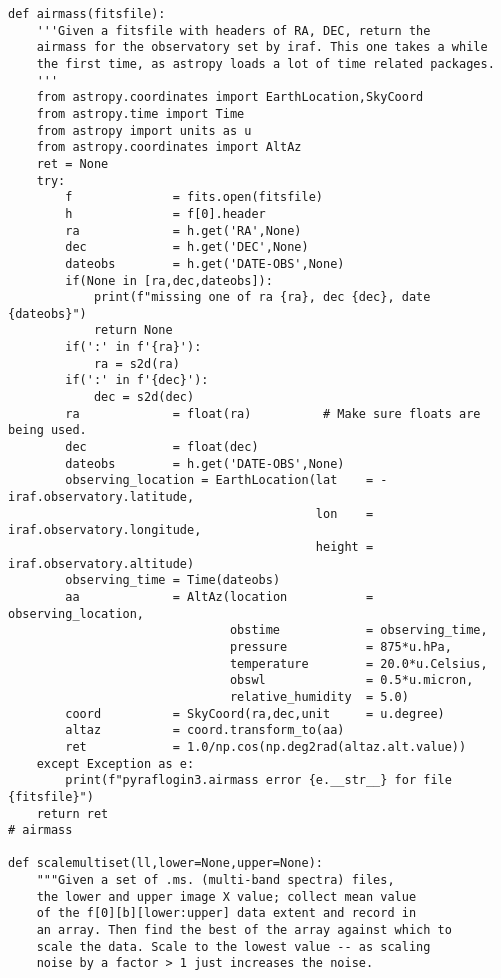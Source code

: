 {\begin{verbatim}
def airmass(fitsfile):
    '''Given a fitsfile with headers of RA, DEC, return the
    airmass for the observatory set by iraf. This one takes a while
    the first time, as astropy loads a lot of time related packages.
    '''
    from astropy.coordinates import EarthLocation,SkyCoord
    from astropy.time import Time
    from astropy import units as u
    from astropy.coordinates import AltAz
    ret = None
    try:
        f              = fits.open(fitsfile)
        h              = f[0].header
        ra             = h.get('RA',None)
        dec            = h.get('DEC',None)
        dateobs        = h.get('DATE-OBS',None)
        if(None in [ra,dec,dateobs]):
            print(f"missing one of ra {ra}, dec {dec}, date {dateobs}")
            return None
        if(':' in f'{ra}'):
            ra = s2d(ra)
        if(':' in f'{dec}'):
            dec = s2d(dec)
        ra             = float(ra)          # Make sure floats are being used.
        dec            = float(dec)
        dateobs        = h.get('DATE-OBS',None)
        observing_location = EarthLocation(lat    = -iraf.observatory.latitude,
                                           lon    = iraf.observatory.longitude,
                                           height = iraf.observatory.altitude)
        observing_time = Time(dateobs)
        aa             = AltAz(location           = observing_location,
                               obstime            = observing_time,
                               pressure           = 875*u.hPa,
                               temperature        = 20.0*u.Celsius,
                               obswl              = 0.5*u.micron,
                               relative_humidity  = 5.0)
        coord          = SkyCoord(ra,dec,unit     = u.degree)
        altaz          = coord.transform_to(aa)
        ret            = 1.0/np.cos(np.deg2rad(altaz.alt.value))
    except Exception as e:
        print(f"pyraflogin3.airmass error {e.__str__} for file {fitsfile}")
    return ret
# airmass

def scalemultiset(ll,lower=None,upper=None):
    """Given a set of .ms. (multi-band spectra) files,
    the lower and upper image X value; collect mean value
    of the f[0][b][lower:upper] data extent and record in
    an array. Then find the best of the array against which to
    scale the data. Scale to the lowest value -- as scaling
    noise by a factor > 1 just increases the noise.


\end{verbatim}}
